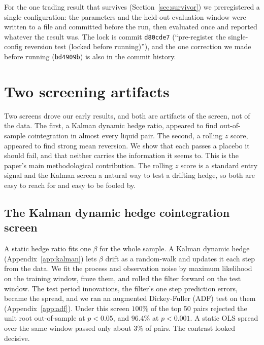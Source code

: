 \documentclass[11pt]{article}
\begin{document}
For the one trading result that survives (Section~\ref{sec:survivor}) we preregistered a single
configuration: the parameters and the held-out evaluation window were written to a file and
committed before the run, then evaluated once and reported whatever the result was. The lock is
commit \texttt{d80cde7} (``pre-register the single-config reversion test (locked before
running)''), and the one correction we made before running (\texttt{bd4909b}) is also in the
commit history.

\section{Two screening artifacts}
\label{sec:artifacts}

Two screens drove our early results, and both are artifacts of the screen, not of the data. The first, a Kalman dynamic
hedge ratio, appeared to find out-of-sample cointegration in almost every liquid pair. The
second, a rolling $z$ score, appeared to find strong mean reversion. We show that each passes
a placebo it should fail, and that neither carries the information it seems to. This is the
paper's main methodological contribution. The rolling $z$ score is a standard entry signal and the
Kalman screen a natural way to test a drifting hedge, so both are easy to reach for and easy to be
fooled by.

\subsection{The Kalman dynamic hedge cointegration screen}
\label{sec:kalman}

A static hedge ratio fits one $\beta$ for the whole sample. A Kalman dynamic hedge (Appendix~\ref{app:kalman}) lets
$\beta$ drift as a random-walk and updates it each step from the data. We fit the process and
observation noise by maximum likelihood on the training window, froze them, and rolled the
filter forward on the test window. The test period innovations, the filter's one step
prediction errors, became the spread, and we ran an augmented Dickey-Fuller (ADF) test on
them~\cite{saiddickey1984} (Appendix~\ref{app:adf}). Under this screen $100\%$ of the top 50 pairs rejected the unit root out-of-sample at
$p<0.05$, and $96.4\%$ at $p<0.001$. A static OLS spread over the same window passed only
about $3\%$ of pairs. The contrast looked decisive.
\end{document}

